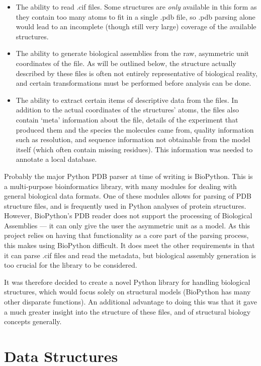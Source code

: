 \begin{itemize}
  \item The ability to read .cif files. Some structures are \emph{only} available in this form as they contain too many atoms to fit in a single .pdb file, so .pdb parsing alone would lead to an incomplete (though still very large) coverage of the available structures.
  \item The ability to generate biological assemblies from the raw, asymmetric unit coordinates of the file. As will be outlined below, the structure actually described by these files is often not entirely representative of biological reality, and certain transformations must be performed before analysis can be done.
  \item The ability to extract certain items of descriptive data from the files. In addition to the actual coordinates of the structures' atoms, the files also contain `meta' information about the file, details of the experiment that produced them and the species the molecules came from, quality information such as resolution, and sequence information not obtainable from the model itself (which often contain missing residues). This information was needed to annotate a local database.
\end{itemize}

Probably the major Python PDB parser at time of writing is BioPython. This is a multi-purpose bioinformatics library, with many modules for dealing with general biological data formats. One of these modules allows for parsing of PDB structure files, and is frequently used in Python analyses of protein structures. However, BioPython's PDB reader does not support the processing of Biological Assemblies --- it can only give the user the asymmetric unit as a model. As this project relies on having that functionality as a core part of the parsing process, this makes using BioPython difficult. It does meet the other requirements in that it can parse .cif files and read the metadata, but biological assembly generation is too crucial for the library to be considered.

It was therefore decided to create a novel Python library for handling biological structures, which would focus solely on structural models (BioPython has many other disparate functions). An additional advantage to doing this was that it gave a much greater insight into the structure of these files, and of structural biology concepts generally.

\section{Data Structures}


